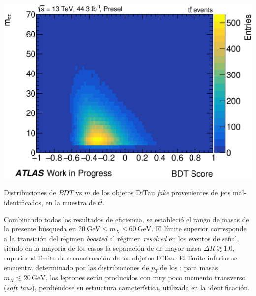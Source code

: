 \begin{marginfigure}[-2em]
    \includegraphics[width=0.99\linewidth]{Assets/Plots/DiTau/Presel/ttbar_leptonOR/h_mc16d_ttbar_ditau_bdt_m.eps}
    \caption{Distribuciones de $BDT$ vs $m$ de los objetos DiTau \textit{fake} provenientes de jets mal-identificados, en la muestra de $t\bar{t}$.}
    \label{fig:ch3:ditau:bdt_vs_m}
\end{marginfigure}

Combinando todos los resultados de eficiencia, se estableció el rango de masas de la presente búsqueda en $\SI{20}{\GeV} \leq m_X \leq \SI{60}{\GeV}$. El límite superior corresponde a la transición del régimen \textit{boosted} al régimen \textit{resolved} en los eventos de señal, siendo en la mayoría de los casos la separación de \ttaus de mayor masa $\Delta R \gtrsim 1.0$, superior al límite de reconstrucción de los objetos DiTau. El límite inferior se encuentra determinado por las distribuciones de $p_T$ de los \ttaus: para masas $m_X \lesssim \SI{20}{\GeV}$, los leptones serán producidos con muy poco momento transverso (\textit{soft taus}), perdiéndose su estructura característica, utilizada en la identificación.

